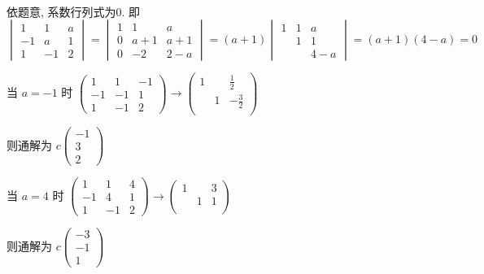 	 \paragraph{} %
		 依题意, 系数行列式为0. 即
		 \[ \begin{vmatrix}
				 1  & 1  & a \\
				 -1 & a  & 1 \\
				 1  & -1 & 2
			 \end{vmatrix} = \begin{vmatrix}
				 1 & 1   & a   \\
				 0 & a+1 & a+1 \\
				 0 & -2  & 2-a
			 \end{vmatrix} = (a+1)\begin{vmatrix}
				 1 & 1 & a   \\
				   & 1 & 1   \\
				   &   & 4-a
			 \end{vmatrix} = (a+1)(4-a) = 0 \]

		 当 \( a = -1 \) 时 \( \begin{pmatrix}
			 1  & 1  & -1 \\
			 -1 & -1 & 1  \\
			 1  & -1 & 2
		 \end{pmatrix} \rightarrow \begin{pmatrix}
			 1 &   & \frac{1}{2}  \\
			   & 1 & -\frac{3}{2} \\
			   &   &
		 \end{pmatrix} \)

		 则通解为 \( c\begin{pmatrix}
			 -1 \\
			 3  \\
			 2
		 \end{pmatrix} \)

		 当 \( a = 4 \) 时 \( \begin{pmatrix}
			 1  & 1  & 4 \\
			 -1 & 4  & 1 \\
			 1  & -1 & 2
		 \end{pmatrix} \rightarrow \begin{pmatrix}
			 1 &   & 3 \\
			   & 1 & 1 \\
			   &   &
		 \end{pmatrix} \)

		 则通解为 \( c\begin{pmatrix}
			 -3 \\
			 -1 \\
			 1
		 \end{pmatrix} \)


